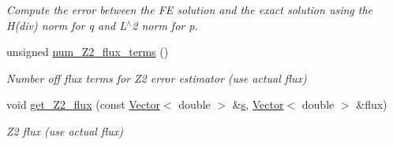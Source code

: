 \begin{DoxyCompactItemize}
\begin{DoxyCompactList}\small\item\em Compute the error between the FE solution and the exact solution using the H(div) norm for q and L$^\wedge$2 norm for p. \end{DoxyCompactList}\item 
unsigned \hyperlink{classoomph_1_1DarcyEquations_a8315f65f0b04934eea304e60725a7268}{num\+\_\+\+Z2\+\_\+flux\+\_\+terms} ()
\begin{DoxyCompactList}\small\item\em Number off flux terms for Z2 error estimator (use actual flux) \end{DoxyCompactList}\item 
void \hyperlink{classoomph_1_1DarcyEquations_a5c077b66056e1d66c0bd8f0430875bf8}{get\+\_\+\+Z2\+\_\+flux} (const \hyperlink{classoomph_1_1Vector}{Vector}$<$ double $>$ \&\hyperlink{cfortran_8h_ab7123126e4885ef647dd9c6e3807a21c}{s}, \hyperlink{classoomph_1_1Vector}{Vector}$<$ double $>$ \&flux)
\begin{DoxyCompactList}\small\item\em Z2 flux (use actual flux) \end{DoxyCompactList}\end{DoxyCompactItemize}
